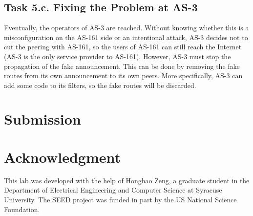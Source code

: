 \subsection{Task 5.c. Fixing the Problem at AS-3} 

Eventually, the operators of AS-3 are reached. Without knowing 
whether this is a misconfiguration on the AS-161 side or an intentional
attack, AS-3 decides not to cut the peering with AS-161, so the users 
of AS-161 can still reach the Internet (AS-3 is the only service 
provider to AS-161). However, AS-3 must stop the propagation of the 
fake announcement. This can be done by removing the 
fake routes from its own announcement to its own peers.
More specifically, AS-3 can add some code to its 
filters, so the fake routes will be discarded. 


\section{Submission}





\section*{Acknowledgment} 

This lab was developed with the help of Honghao Zeng, 
a graduate student in the Department of Electrical Engineering 
and Computer Science at Syracuse University. 
The SEED project was funded in part 
by the US National Science Foundation. 







